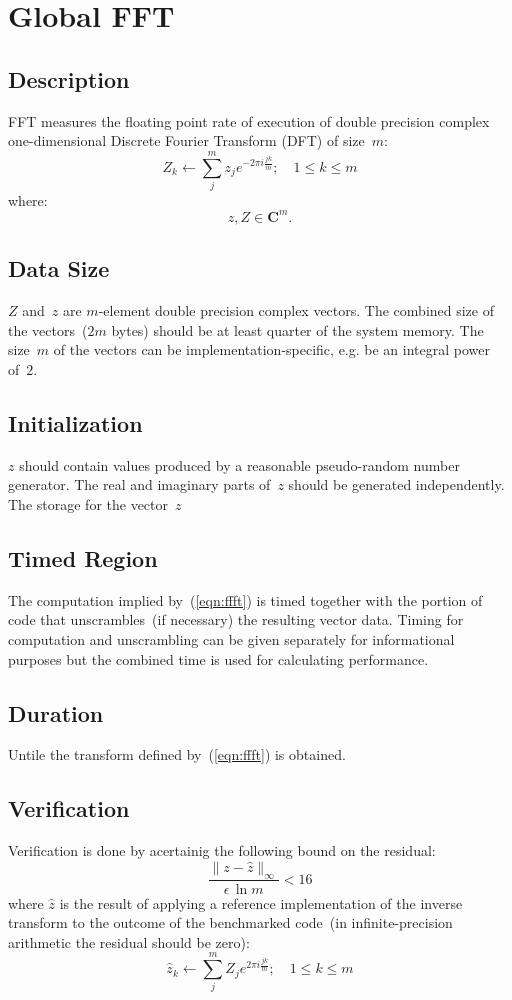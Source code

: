 \documentclass[twocolumn,draft]{article}
\newcommand{\FFT}{\textsf{FFT}\xspace}
\begin{document}
\section{Global \FFT}

\subsection{Description}
\FFT measures the floating point rate of execution of double precision
complex one-dimensional Discrete Fourier Transform (DFT) of size~$m$:
\begin{equation}
Z_k\leftarrow\sum_j^m z_j e^{-2\pi i\frac{jk}{m}}; \quad 1 \le k \le m
\label{eqn:ffft}
\end{equation}
where:
\[z, Z\in\mathbf{C}^m.\]

\subsection{Data Size}
$Z$ and~$z$ are $m$-element double precision complex vectors. The combined size
of the vectors~($2m$ bytes) should be at least quarter of the system memory.
The size~$m$ of the vectors can be implementation-specific, e.g. be an integral
power of~$2$.

\subsection{Initialization}
$z$ should contain values produced by a reasonable pseudo-random number
generator. The real and imaginary parts of~$z$ should be generated
independently. The storage for the vector~$z$

\subsection{Timed Region}
The computation implied by~(\ref{eqn:ffft}) is timed together with the portion
of code that unscrambles~(if necessary) the resulting vector data. Timing for
computation and unscrambling can be given separately for informational
purposes but the combined time is used for calculating performance.

\subsection{Duration}
Untile the transform defined by~(\ref{eqn:ffft}) is obtained.

\subsection{Verification}
Verification is done by acertainig the following bound on the residual:
\begin{equation}
\frac{\|z-\hat{z}\|_{\infty}}{\epsilon\,\ln m} < 16
\end{equation}
where $\hat{z}$ is the result of applying a reference implementation of the
inverse transform to the outcome of the benchmarked code~(in infinite-precision
arithmetic the residual should be zero):
\begin{equation}
\hat{z}_k\leftarrow\sum_j^m Z_j e^{2\pi i\frac{jk}{m}}; \quad 1 \le k \le m
\end{equation}
\end{document}
